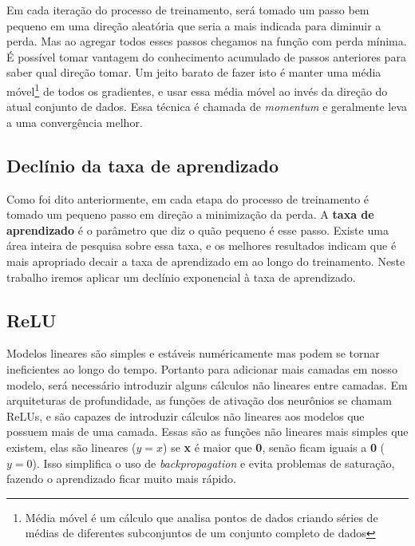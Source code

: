 Em cada iteração do processo de treinamento, será tomado um passo bem
pequeno em uma direção aleatória que seria a mais indicada para
diminuir a perda. Mas ao agregar todos esses passos chegamos na função
com perda mínima. É possível tomar vantagem do conhecimento acumulado
de passos anteriores para saber qual direção tomar. Um jeito barato de
fazer isto é manter uma média móvel\footnote{Média móvel é um cálculo
  que analisa pontos de dados criando séries de médias de diferentes
  subconjuntos de um conjunto completo de dados} de todos os
gradientes, e usar essa média móvel ao invés da direção do atual
conjunto de dados. Essa técnica é chamada de \textit{momentum} e
geralmente leva a uma convergência melhor.

\subsection{Declínio da taxa de aprendizado}

Como foi dito anteriormente, em cada etapa do processo de treinamento
é tomado um pequeno passo em direção a minimização da perda. A {\bf
  taxa de aprendizado} é o parâmetro que diz o quão pequeno é esse
passo. Existe uma área inteira de pesquisa sobre essa taxa, e os
melhores resultados indicam que é mais apropriado decair a taxa de
aprendizado em ao longo do treinamento. Neste trabalho iremos aplicar
um declínio exponencial à taxa de aprendizado.\cite{Zeiler}

\subsection{ReLU}

Modelos lineares são simples e estáveis numéricamente mas podem se
tornar ineficientes ao longo do tempo. Portanto para adicionar mais
camadas em nosso modelo, será necessário introduzir alguns cálculos
não lineares entre camadas. Em arquiteturas de profundidade, as
funções de ativação dos neurônios se chamam ReLUs, e são capazes de
introduzir cálculos não lineares aos modelos que possuem mais de uma
camada. Essas são as funções não lineares mais simples que
existem, elas são lineares ($y=x$) se {\bf x} é maior que {\bf 0},
senão ficam iguais a {\bf 0} ($y=0$). Isso simplifica o uso de
\textit{backpropagation} e evita problemas de saturação, fazendo o
aprendizado ficar muito mais rápido.

